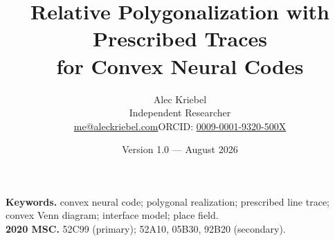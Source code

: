 \documentclass[11pt]{article}
\title{\bfseries Relative Polygonalization with Prescribed Traces\\
for Convex Neural Codes}
\author{Alec Kriebel\\[0.2em]
\small Independent Researcher\\
\small \href{mailto:me@aleckriebel.com}{me@aleckriebel.com}\quad\textbar\quad ORCID: \href{https://orcid.org/0009-0001-9320-500X}{0009-0001-9320-500X}}
\date{Version 1.0 --- August 2026}
\theoremstyle{definition}
\theoremstyle{remark}
\begin{document}
\maketitle

\noindent\textbf{Keywords.} convex neural code; polygonal realization; prescribed line trace; convex Venn diagram; interface model; place field.\\
\textbf{2020 MSC.} 52C99 (primary); 52A10, 05B30, 92B20 (secondary).













\appendix







\end{document}
